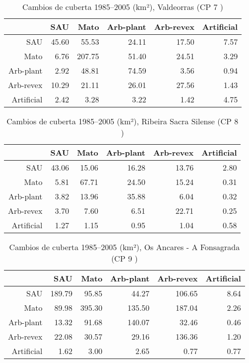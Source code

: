 \begin{table}[p]
\centering
\caption{Cambios de cuberta 1985--2005 (km²), Valdeorras (CP 7 )} 
\label{TaboaContinxCP7}
\begin{tabular}{rrrrrr}
  \hline
 & SAU & Mato & Arb-plant & Arb-revex & Artificial \\ 
  \hline
SAU & 45.60 & 55.53 & 24.11 & 17.50 & 7.57 \\ 
  Mato & 6.76 & 207.75 & 51.40 & 24.51 & 3.29 \\ 
  Arb-plant & 2.92 & 48.81 & 74.59 & 3.56 & 0.94 \\ 
  Arb-revex & 10.29 & 21.11 & 26.01 & 27.56 & 1.43 \\ 
  Artificial & 2.42 & 3.28 & 3.22 & 1.42 & 4.75 \\ 
   \hline
\end{tabular}
\end{table}
\begin{table}[p]
\centering
\caption{Cambios de cuberta 1985--2005 (km²), Ribeira Sacra Silense (CP 8 )} 
\label{TaboaContinxCP8}
\begin{tabular}{rrrrrr}
  \hline
 & SAU & Mato & Arb-plant & Arb-revex & Artificial \\ 
  \hline
SAU & 43.06 & 15.06 & 16.28 & 13.76 & 2.80 \\ 
  Mato & 5.81 & 67.71 & 24.50 & 15.24 & 0.31 \\ 
  Arb-plant & 3.82 & 13.96 & 35.88 & 6.04 & 0.32 \\ 
  Arb-revex & 3.70 & 7.60 & 6.51 & 22.71 & 0.25 \\ 
  Artificial & 1.27 & 1.15 & 0.95 & 1.04 & 0.58 \\ 
   \hline
\end{tabular}
\end{table}
\begin{table}[p]
\centering
\caption{Cambios de cuberta 1985--2005 (km²), Os Ancares - A Fonsagrada (CP 9 )} 
\label{TaboaContinxCP9}
\begin{tabular}{rrrrrr}
  \hline
 & SAU & Mato & Arb-plant & Arb-revex & Artificial \\ 
  \hline
SAU & 189.79 & 95.85 & 44.27 & 106.65 & 8.64 \\ 
  Mato & 89.98 & 395.30 & 135.50 & 187.04 & 2.26 \\ 
  Arb-plant & 13.32 & 91.68 & 140.07 & 32.46 & 0.46 \\ 
  Arb-revex & 22.08 & 30.57 & 29.16 & 136.36 & 1.20 \\ 
  Artificial & 1.62 & 3.00 & 2.65 & 0.77 & 0.77 \\ 
   \hline
\end{tabular}
\end{table}
